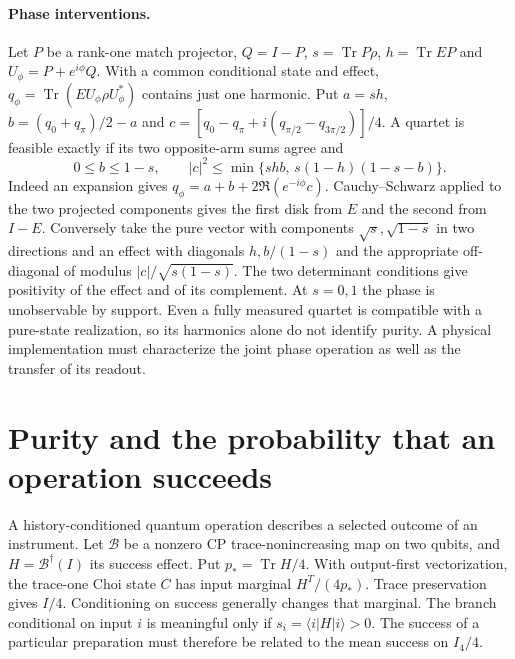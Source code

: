 \documentclass[11pt,letterpaper]{article}
\newcommand{\tr}{\operatorname{Tr}}\newcommand{\TV}{\operatorname{TV}}\newcommand{\E}{\mathbb E}\newcommand{\id}{\mathbb I}\newcommand{\calB}{\mathcal B}\newcommand{\norm}[1]{\left\lVert#1\right\rVert}
\begin{document}
\paragraph{Phase interventions.}
Let $P$ be a rank-one match projector, $Q=I-P$, $s=\tr P\rho$, $h=\tr EP$ and $U_\phi=P+e^{i\phi}Q$. With a common conditional state and effect, $q_\phi=\tr(EU_\phi\rho U_\phi^*)$ contains just one harmonic. Put $a=sh$, $b=(q_0+q_\pi)/2-a$ and $c=[q_0-q_\pi+i(q_{\pi/2}-q_{3\pi/2})]/4$. A quartet is feasible exactly if its two opposite-arm sums agree and
\[
 0\le b\le1-s,\qquad |c|^2\le\min\{shb,\,s(1-h)(1-s-b)\}.
\]
Indeed an expansion gives $q_\phi=a+b+2\Re(e^{-i\phi}c)$. Cauchy–Schwarz applied to the two projected components gives the first disk from $E$ and the second from $I-E$. Conversely take the pure vector with components $\sqrt{s},\sqrt{1-s}$ in two directions and an effect with diagonals $h,b/(1-s)$ and the appropriate off-diagonal of modulus $|c|/\sqrt{s(1-s)}$. The two determinant conditions give positivity of the effect and of its complement. At $s=0,1$ the phase is unobservable by support. Even a fully measured quartet is compatible with a pure-state realization, so its harmonics alone do not identify purity. A physical implementation must characterize the joint phase operation as well as the transfer of its readout.

\section{Purity and the probability that an operation succeeds}\label{sec:purity}

A history-conditioned quantum operation describes a selected outcome of an instrument. Let $\calB$ be a nonzero CP trace-nonincreasing map on two qubits, and $H=\calB^\dagger(I)$ its success effect. Put $p_*=\tr H/4$. With output-first vectorization, the trace-one Choi state $C$ has input marginal $H^T/(4p_*)$. Trace preservation gives $I/4$. Conditioning on success generally changes that marginal. The branch conditional on input $i$ is meaningful only if $s_i=\langle i|H|i\rangle>0$. The success of a particular preparation must therefore be related to the mean success on $I_4/4$.
\end{document}
